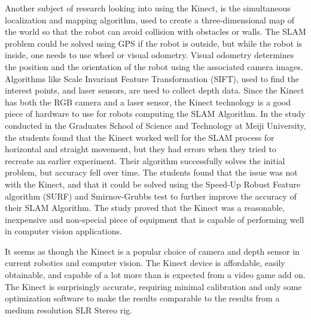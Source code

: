 \documentclass[pdftex,10.5pt]{report}
\begin{document}
Another subject of research looking into using the Kinect, is the simultaneous localization and mapping algorithm, used to create a three-dimensional map of the world so that the robot can avoid collision with obstacles or walls. The SLAM problem could be solved using GPS if the robot is outside, but while the robot is inside, one needs to use wheel or visual odometry. Visual odometry determines the position and the orientation of the robot using the associated camera images. Algorithms like Scale Invariant Feature Transformation (SIFT), used to find the interest points, and laser sensors, are used to collect depth data. Since the Kinect has both the RGB camera and a laser sensor, the Kinect technology is a good piece of hardware to use for robots computing the SLAM Algorithm. In the study conducted in the Graduates School of Science and Technology at Meiji University, the students found that the Kinect worked well for the SLAM process for horizontal and straight movement, but they had errors when they tried to recreate an earlier experiment. Their algorithm successfully solves the initial problem, but accuracy fell over time.\cite{cite2} The students found that the issue was not with the Kinect, and that it could be solved using the Speed-Up Robust Feature algorithm (SURF) and Smirnov-Grubbs test to further improve the accuracy of their SLAM Algorithm. The study proved that the Kinect was a reasonable, inexpensive and non-special piece of equipment that is capable of performing well in computer vision applications.

It seems as though the Kinect is a popular choice of camera and depth sensor in current robotics and computer vision. The Kinect device is affordable, easily obtainable, and capable of a lot more than is expected from a video game add on. The Kinect is surprisingly accurate, requiring minimal calibration and only some optimization software to make the results comparable to the results from a medium resolution SLR Stereo rig.
\end{document}
